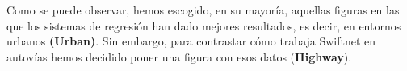 Como se puede observar, hemos escogido, en su mayoría, aquellas figuras en las que los sistemas de regresión han dado mejores resultados, es decir, en entornos urbanos \textbf{(Urban)}. Sin embargo, para contrastar cómo trabaja Swiftnet en autovías hemos decidido poner una figura con esos datos (\textbf{Highway}).

